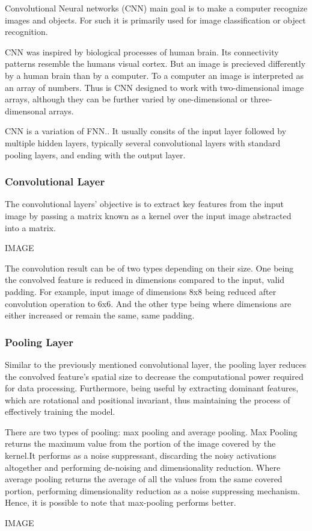 
{\color{red}
Convolutional Neural networks (CNN) main goal is to make a computer recognize images and objects. For such it is primarily used for image classification or object recognition.

CNN was inspired by biological processes of human brain. Its connectivity patterns resemble the humans visual cortex. But an image is precieved differently by a human brain than by a computer. To a computer an image is interpreted as an array of numbers. Thus is CNN designed to work with two-dimensional image arrays, although they can be further varied by one-dimensional or three-dimensonal arrays.\cite{mlmastery}

CNN is a variation of FNN.\cite{Goodfellow-et-al-2016}. It usually consits of the input layer followed by multiple hidden layers, typically several convolutional layers with standard pooling layers, and ending with the output layer. 
}
\subsubsection{Convolutional Layer}

The convolutional layers' objective is to extract key features from the input image by passing a matrix known as a kernel over the input image abstracted into a matrix.\cite{mathworkscnn}

IMAGE

{\color{red}
The convolution result can be of two types depending on their size. One being the convolved feature is reduced in dimensions compared to the input, valid padding. For example, input image of dimensions 8x8 being reduced after convolution operation to 6x6. And the other type being where dimensions are either increased or remain the same, same padding. \cite{compguideCnn}
}

\subsubsection{Pooling Layer}


Similar to the previously mentioned convolutional layer, the pooling layer reduces the convolved feature's spatial size to decrease the computational power required for data processing. Furthermore, being useful by extracting dominant features, which are rotational and positional invariant, thus maintaining the process of effectively training the model.\cite{compguideCnn}

There are two types of pooling: max pooling and average pooling. Max Pooling returns the maximum value from the portion of the image covered by the kernel.It performs as a noise suppressant, discarding the noisy activations altogether and performing de-noising and dimensionality reduction. Where average pooling returns the average of all the values from the same covered portion, performing dimensionality reduction as a noise suppressing mechanism. Hence, it is possible to note that max-pooling performs better.\cite{compguideCnn}

IMAGE